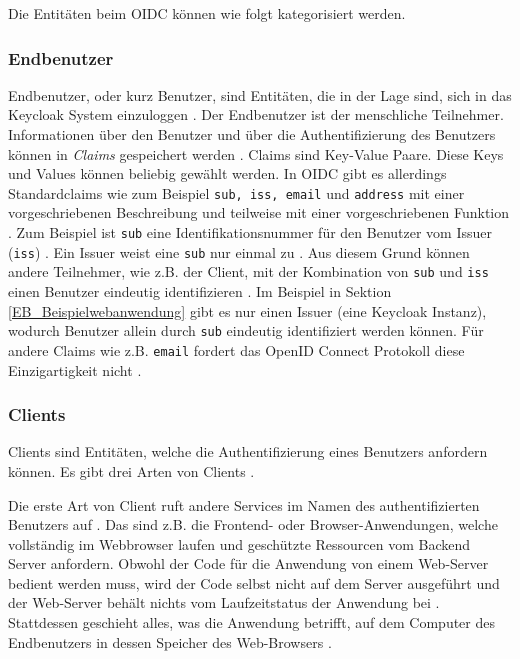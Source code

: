 Die Entitäten beim OIDC können wie folgt kategorisiert werden.

\subsubsection{Endbenutzer} \label{EB_End-Benutzer}

Endbenutzer, oder kurz Benutzer, sind Entitäten, die in der Lage sind, sich in das Keycloak System einzuloggen \cite[Core Concepts and Terms]{SSEB_keycloakDocs}. Der Endbenutzer ist der menschliche Teilnehmer. Informationen über den Benutzer und über die Authentifizierung des Benutzers können in \textit{Claims} gespeichert werden \cite[Terminology]{EB4}. Claims sind Key-Value Paare. Diese Keys und Values können beliebig gewählt werden. In OIDC gibt es allerdings Standardclaims wie zum Beispiel \texttt{sub, iss, email} und \texttt{address} mit einer vorgeschriebenen Beschreibung und teilweise mit einer vorgeschriebenen Funktion \cite[Standard Claims]{EB4}. Zum Beispiel ist \texttt{sub} eine Identifikationsnummer für den Benutzer vom Issuer (\texttt{iss}) \cite[Standard Claims]{EB4}. Ein Issuer weist eine \texttt{sub} nur einmal zu \cite[Claim Stability]{EB4}. Aus diesem Grund können andere Teilnehmer, wie z.B. der Client, mit der Kombination von \texttt{sub} und \texttt{iss} einen Benutzer eindeutig identifizieren \cite[Claim Stability]{EB4}. Im Beispiel in Sektion \ref{EB_Beispielwebanwendung} gibt es nur einen Issuer (eine Keycloak Instanz), wodurch Benutzer allein durch \texttt{sub} eindeutig identifiziert werden können. Für andere Claims wie z.B. \texttt{email} fordert das OpenID Connect Protokoll diese Einzigartigkeit nicht \cite[Claim Stability]{EB4}.

\subsubsection{Clients} \label{EB_Client}

Clients sind Entitäten, welche die Authentifizierung eines Benutzers anfordern können. Es gibt drei Arten von Clients \cite{SSEB_OAuth2inAction}.

Die erste Art von Client ruft andere Services im Namen des authentifizierten Benutzers auf \cite[Sec. 1.1]{SSEB_RFC6749} \cite[Managing Clients]{SSEB_keycloakDocs}. Das sind z.B. die Frontend- oder Browser-Anwendungen, welche vollständig im Webbrowser laufen und geschützte Ressourcen vom Backend Server anfordern. Obwohl der Code für die Anwendung von einem Web-Server bedient werden muss, wird der Code selbst nicht auf dem Server ausgeführt und der Web-Server behält nichts vom Laufzeitstatus der Anwendung bei \cite{SSEB_OAuth2inAction}. Stattdessen geschieht alles, was die Anwendung betrifft, auf dem Computer des Endbenutzers in dessen Speicher des Web-Browsers \cite{SSEB_OAuth2inAction}.

